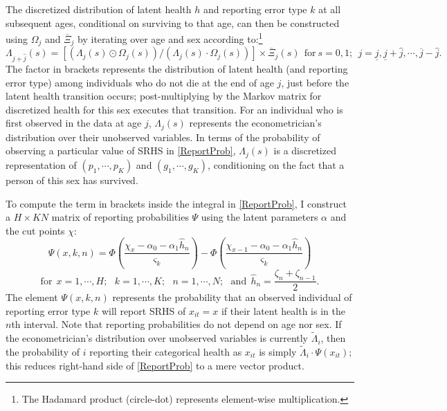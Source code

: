 \documentclass[12pt,pdftex,letterpaper]{article}
\newcommand{\Health}{h}
\newcommand{\Report}{x}
\newcommand{\Age}{j}
\newcommand{\Sex}{s}
\newcommand{\AgeMin}{\underline{\Age}}
\newcommand{\AgeMax}{\overline{\Age}}
\newcommand{\AgeIncr}{\hat{\Age}}
\newcommand{\Cut}{\chi}
\newcommand{\DiscreteCut}{\zeta}
\newcommand{\LatentParam}{\alpha}
\newcommand{\TypeProb}{p}
\newcommand{\ReportStd}{\varsigma}
\newcommand{\LivPrb}{\Omega}
\newcommand{\TransPrb}{\Xi}
\newcommand{\HealthDstn}{\Lambda}
\newcommand{\ReportPrb}{\Psi}
\newcommand{\HealthDstnPcvd}{\widetilde{\Lambda}}
\begin{document}
The discretized distribution of latent health $\Health$ and reporting error type $k$ at all subsequent ages, conditional on surviving to that age, can then be constructed using $\LivPrb_\Age$ and $\overline{\TransPrb}_\Age$ by iterating over age and sex according to:\footnote{The Hadamard product (circle-dot) represents element-wise multiplication.}
\begin{equation}
\HealthDstn_{\Age + \AgeIncr}(\Sex) = \left[ (\HealthDstn_{\Age}(\Sex) \odot \LivPrb_\Age(\Sex)) / (\HealthDstn_{\Age}(\Sex) \cdot \LivPrb_\Age(\Sex)) \right] \times \overline{\TransPrb}_{\Age}(\Sex) ~~\text{for}~ \Sex=0,1; ~~ \Age = \AgeMin, \AgeMin+\AgeIncr, \cdots, \AgeMax-\AgeIncr.
\end{equation}
The factor in brackets represents the distribution of latent health (and reporting error type) among individuals who do not die at the end of age $\Age$, just before the latent health transition occurs; post-multiplying by the Markov matrix for discretized health for this sex executes that transition. For an individual who is first observed in the data at age $\Age$, $\HealthDstn_\Age(s)$ represents the econometrician's distribution over their unobserved variables. In terms of the probability of observing a particular value of SRHS in \eqref{ReportProb}, $\HealthDstn_\Age(s)$ is a discretized representation of $(\TypeProb_1,\cdots,\TypeProb_K)$ and $(g_1,\cdots,g_K)$, conditioning on the fact that a person of this sex has survived.

To compute the term in brackets inside the integral in \eqref{ReportProb}, I construct a $H \times KN$ matrix of reporting probabilities $\ReportPrb$ using the latent parameters $\LatentParam$ and the cut points $\Cut$:
\begin{equation}
\ReportPrb(\Report,k,n) = \Phi \left(\frac{\Cut_{\Report} - \LatentParam_0 - \LatentParam_1 \hat{\Health}_n}{\ReportStd_k} \right) - \Phi \left(\frac{\Cut_{\Report-1} - \LatentParam_0 - \LatentParam_1 \hat{\Health}_n}{\ReportStd_k} \right)
\end{equation}
\begin{equation*}
\text{for}~~x = 1,\cdots,H; ~~~ k=1,\cdots,K; ~~~ n=1,\cdots,N; ~~~ \text{and}~~ \hat{\Health}_n = \frac{\DiscreteCut_n + \DiscreteCut_{n-1}}{2}.
\end{equation*}
The element $\ReportPrb(\Report,k,n)$ represents the probability that an observed individual of reporting error type $k$ will report SRHS of $\Report_{it}=x$ if their latent health is in the $n$th interval.  Note that reporting probabilities do not depend on age nor sex. If the econometrician's distribution over unobserved variables is currently $\HealthDstnPcvd_{i}$, then the probability of $i$ reporting their categorical health as $\Report_{it}$ is simply $\HealthDstnPcvd_{i} \cdot \ReportPrb(\Report_{it})$; this reduces right-hand side of \eqref{ReportProb} to a mere vector product.
\end{document}
